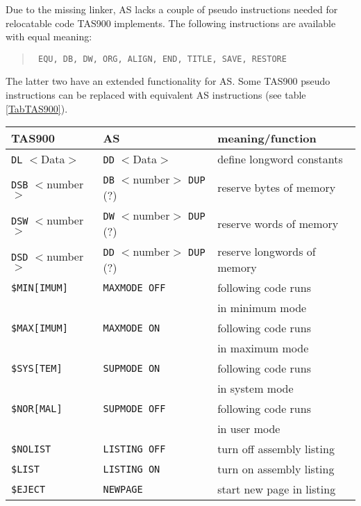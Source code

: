 \documentclass[12pt,twoside]{report}
\newcommand{\tty}[1]{{\tt #1}}
\newcommand{\asname}{{AS}}
\begin{document}
Due to the missing linker, \asname{} lacks a couple of pseudo instructions
needed for relocatable code TAS900 implements.  The following
instructions are available with equal meaning:
\begin{quote}\tt
   EQU, DB, DW, ORG, ALIGN, END, TITLE, SAVE, RESTORE
\rm\end{quote}
The latter two have an extended functionality for \asname{}.  Some TAS900
pseudo instructions can be replaced with equivalent \asname{} instructions (see
table \ref{TabTAS900}).
\par
\begin{table*}[htbp]
\begin{center}\begin{tabular}{|l|l|l|}
\hline
TAS900           & \asname{}                  &     meaning/function \\
\hline
\hline
\tty{DL} $<$Data$>$    & \tty{DD} $<$Data$>$           & define longword constants \\
\hline
\tty{DSB} $<$number$>$ & \tty{DB} $<$number$>$ \tty{DUP} (?) & reserve bytes of memory \\
\hline
\tty{DSW} $<$number$>$ & \tty{DW} $<$number$>$ \tty{DUP} (?) & reserve words of memory \\
\hline
\tty{DSD} $<$number$>$ & \tty{DD} $<$number$>$ \tty{DUP} (?) & reserve longwords of memory \\
\hline
\tty{\$MIN[IMUM]}      & \tty{MAXMODE OFF}             & following code runs \\
                       &                               & in minimum mode \\
\hline
\tty{\$MAX[IMUM]}      & \tty{MAXMODE ON}              & following code runs \\
                       &                               & in maximum mode \\
\hline
\tty{\$SYS[TEM]}       & \tty{SUPMODE ON}              & following code runs \\
                       &                               & in system mode \\
\hline
\tty{\$NOR[MAL]}       & \tty{SUPMODE OFF}             & following code runs \\
                       &                               & in user mode \\
\hline
\tty{\$NOLIST}         & \tty{LISTING OFF}             & turn off assembly listing \\
\hline
\tty{\$LIST}           & \tty{LISTING ON}              & turn on assembly listing \\
\hline
\tty{\$EJECT}          & \tty{NEWPAGE}                 & start new page in listing \\
\hline
\end{tabular}\end{center}
\caption{equivalent instructions TAS900$\leftrightarrow$\asname{}\label{TabTAS900}}
\end{table*}
\end{document}
